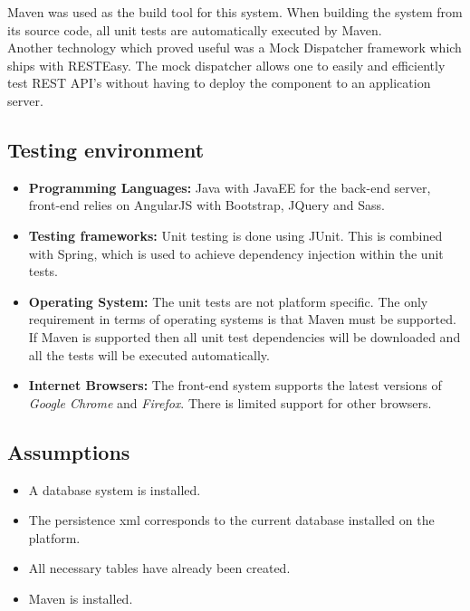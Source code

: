 \documentclass[11pt,a4paper]{article}
\begin{document}
Maven was used as the build tool for this system. When building the system from its source code, all unit tests are automatically executed by Maven.  \\

Another technology which proved useful was a Mock Dispatcher framework which ships with RESTEasy. The mock dispatcher allows one to easily and efficiently test REST API's without having to deploy the component to an application server.

\subsection{Testing environment}
\begin{itemize}
	\item \textbf{Programming Languages:} Java with JavaEE for the back-end server, front-end relies on AngularJS with Bootstrap, JQuery and Sass.
	
	\item \textbf{Testing frameworks: } Unit testing is done using JUnit. This is combined with Spring, which is used to achieve dependency injection within the unit tests.
	
	\item \textbf{Operating System: } The unit tests are not platform specific. The only requirement in terms of operating systems is that Maven must be supported. If Maven is supported then all unit test dependencies will be downloaded and all the tests will be executed automatically.
	
	\item \textbf{Internet Browsers: } The front-end system supports the latest versions of 
	\textit{Google Chrome} and \textit{Firefox}. There is limited support for other browsers.
\end{itemize}

\subsection{Assumptions}
\begin{itemize}
	\item A database system is installed.
	\item The persistence xml corresponds to the current database installed on the platform.
	\item All necessary tables have already been created.
	\item Maven is installed.
\end{itemize}
\end{document}
